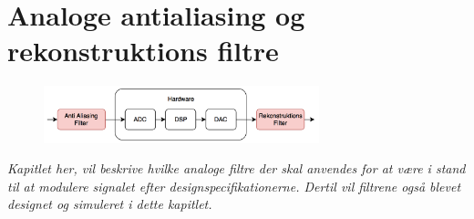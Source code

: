 \chapter{Analoge antialiasing og rekonstruktions filtre}\label{kap:analog_filter}

\begin{figure}[h]
	\vspace*{-1 cm}
	\includegraphics[width=8cm]{billeder/flow_filter}
	\vspace{0.5 cm}
\end{figure}

\emph{Kapitlet her, vil beskrive hvilke analoge filtre der skal anvendes for at være i stand til at modulere signalet efter designspecifikationerne. Dertil vil filtrene også blevet designet og simuleret i dette kapitlet.}
